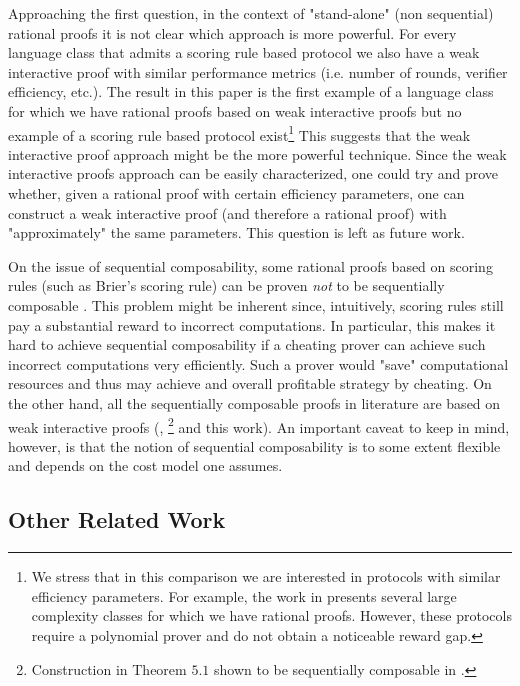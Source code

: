 Approaching the first question, in the context of "stand-alone" (non sequential) rational proofs it is not clear which approach is more powerful. For every language class that admits a scoring rule based protocol we also have a weak interactive proof with similar performance metrics (i.e. number of rounds, verifier efficiency, etc.). The result in this paper is the first example of a language class for which we have rational proofs based on weak interactive proofs but no example of a scoring rule based protocol exist\footnote{We stress that in this comparison we are interested in protocols with similar efficiency parameters. For example, the work in \cite{am} presents several large complexity classes for which we have rational proofs. However, these protocols require a polynomial prover and do not obtain a noticeable reward gap.} This suggests that the weak interactive proof approach might be the more powerful technique. Since the weak interactive proofs approach can be easily characterized, one could try and prove whether, given a rational proof with certain efficiency parameters, one can construct a weak interactive proof (and therefore a rational proof) with "approximately" the same parameters. This question is left as future work.

On the issue of sequential composability, some rational proofs based on scoring rules (such as Brier's scoring rule) can be proven \textit{not} to be sequentially composable \cite{cg15}.
This problem might be inherent since, intuitively, scoring rules still pay a substantial reward to incorrect computations. In particular, this makes it hard to achieve sequential composability if a cheating prover can achieve such incorrect computations very efficiently. Such a prover would "save" computational resources and thus may achieve and overall profitable strategy by cheating.
On the other hand, all the sequentially composable proofs in literature are based on weak interactive proofs (\cite{cg15}, \cite{am1}\footnote{Construction in Theorem $5.1$ shown to be sequentially composable in \cite{cg15}.} and this work).
An important caveat to keep in mind, however, is that the notion of sequential composability is to some extent flexible and depends
on the cost model one assumes. %

\subsection{Other Related  Work}
\label{sec:prior}


